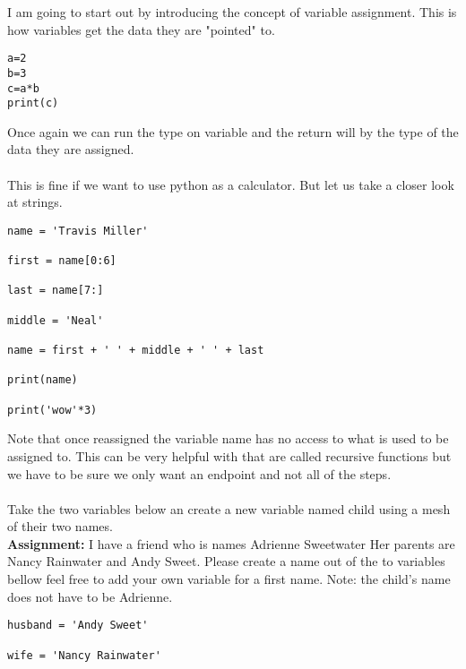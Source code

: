 \documentclass[../main.tex]{subfiles}
\begin{document}
I am going to start out by introducing the concept of variable assignment. This is how variables get the data they are "pointed" to.
\begin{lstlisting}
a=2
b=3
c=a*b
print(c)
\end{lstlisting}
Once again we can run the type on variable and the return will by the type of the data they are assigned.\\
\\
This is fine if we want to use python as a calculator. But let us take a closer look at strings.
\begin{lstlisting}
name = 'Travis Miller'

first = name[0:6]

last = name[7:]

middle = 'Neal'

name = first + ' ' + middle + ' ' + last

print(name)

print('wow'*3)
\end{lstlisting}
Note that once reassigned the variable name has no access to what is used to be assigned to. This can be very helpful with that are called recursive functions but we have to be sure we only want an endpoint and not all of the steps. \\
\\
Take the two variables below an create a new variable named child using a mesh of their two names.
\\
{\bf Assignment:}
I have a friend who is names Adrienne Sweetwater Her parents are Nancy Rainwater and Andy Sweet. Please create a name out of the to variables bellow feel free to add your own variable for a first name. Note: the child's name does not have to be Adrienne.
\begin{lstlisting}
husband = 'Andy Sweet'

wife = 'Nancy Rainwater'
\end{lstlisting}
\newpage
\end{document}
